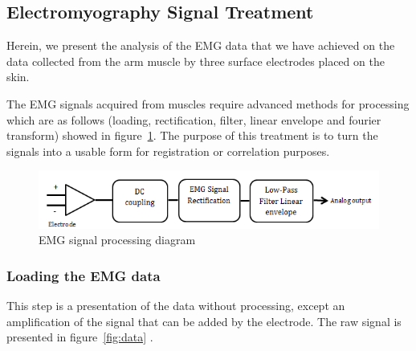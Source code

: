 \documentclass[conference]{IEEEtran}
\begin{document}
\subsection{Electromyography Signal Treatment} \label{sub:EMGsignaltreatment}\par
Herein, we present the analysis of the EMG data that we have achieved on the data collected from the arm muscle by three surface electrodes placed on the skin.\par
The EMG signals acquired from muscles require advanced methods for processing which are as follows (loading, rectification, filter, linear envelope and fourier transform) showed in figure~\ref{fig:struct}. The purpose of this treatment is to turn the signals into a usable form  for registration or correlation purposes.\par

\begin{figure}[!hb]
    \includegraphics[scale=0.45]{fig0.png}
    \caption{EMG signal processing diagram}
    \label{fig:struct}
\end{figure}


\subsubsection{Loading the EMG data} \label{sub:LoadingtheEMGdata}\par
This step is a presentation of the data without processing, except an amplification of the signal that can be added by the electrode. The raw signal is presented in figure~\ref{fig:data} .\par
\end{document}
